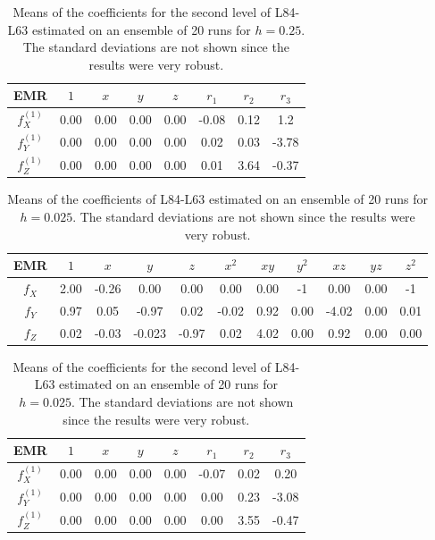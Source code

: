 \documentclass[12pt]{article}
\begin{document}
\begin{table}[H]
	\centering
	\begin{tabular}{c | ccccccc}
		EMR & $1$ & $x$ & $y$ & $z$ & $r_1$ & $r_2$ & $r_3$  \\ \hline
		$f^{(1)}_X$ & 0.00& 0.00 & 0.00 & 0.00 & -0.08& 0.12 & 1.2 \\ 
		$f^{(1)}_Y$ & 0.00 & 0.00 & 0.00 & 0.00 & 0.02 & 0.03 & -3.78 \\ 
		$f^{(1)}_Z$ & 0.00 & 0.00 & 0.00 & 0.00 & 0.01 & 3.64 & -0.37  \\ 
	\end{tabular}
	\caption{Means of the coefficients for the second level of L84-L63 estimated on an ensemble of 20 runs for $h=0.25$. The standard deviations are not shown since the results were very robust.}
\end{table}

\begin{table}[H]
	\centering
	\begin{tabular}{c | cccccccccc}
		EMR & $1$ & $x$ & $y$ & $z$ & $x^2$ & $xy$ & $y^2$ & $xz$ & $yz$ & $z^2$  \\ \hline
		$f_X$ & 2.00 & -0.26& 0.00 & 0.00 & 0.00 & 0.00 & -1 & 0.00 & 0.00 & -1 \\
		$f_Y$ & 0.97 & 0.05 & -0.97 & 0.02 & -0.02 & 0.92 & 0.00 & -4.02& 0.00 & 0.01 \\
		$f_Z$ & 0.02& -0.03 & -0.023 & -0.97 & 0.02 & 4.02 & 0.00 & 0.92 & 0.00 & 0.00 \\ 
	\end{tabular}
	\caption{Means of the coefficients of L84-L63 estimated on an ensemble of 20 runs for $h=0.025$. The standard deviations are not shown since the results were very robust.}
\end{table}

\begin{table}[H]
	\centering
	\begin{tabular}{c | ccccccc}
		EMR & $1$ & $x$ & $y$ & $z$ & $r_1$ & $r_2$ & $r_3$  \\ \hline
		$f^{(1)}_X$ & 0.00 & 0.00 & 0.00 & 0.00 & -0.07 & 0.02 & 0.20 \\ 
		$f^{(1)}_Y$ & 0.00& 0.00 & 0.00 &0.00& 0.00 & 0.23 & -3.08 \\ 
		$f^{(1)}_Z$ & 0.00 & 0.00 & 0.00 & 0.00 & 0.00 & 3.55 & -0.47 \\ 
	\end{tabular}
	\caption{Means of the coefficients for the second level of L84-L63 estimated on an ensemble of 20 runs for $h=0.025$. The standard deviations are not shown since the results were very robust.}
\end{table}
\end{document}
